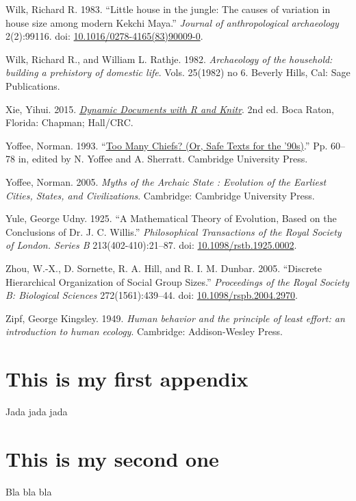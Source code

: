 \documentclass[
  12pt,
]{book}
\newlength{\cslhangindent}
\newlength{\cslentryspacingunit} %
\newenvironment{CSLReferences}[2] %
 {%
  \setlength{\parindent}{0pt}
  \ifodd #1
  \let\oldpar\par
  \def\par{\hangindent=\cslhangindent\oldpar}
  \fi
  \setlength{\parskip}{#2\cslentryspacingunit}
 }%
 {}
\begin{document}
\begin{CSLReferences}{1}{0}
\leavevmode{}%
Wilk, Richard R. 1983. {``Little house in the jungle: The causes of variation in house size among modern Kekchi Maya.''} \emph{Journal of anthropological archaeology} 2(2):99116. doi: \href{https://doi.org/10.1016/0278-4165(83)90009-0}{10.1016/0278-4165(83)90009-0}.

\leavevmode{}%
Wilk, Richard R., and William L. Rathje. 1982. \emph{Archaeology of the household: building a prehistory of domestic life}. Vols. 25(1982) no 6. Beverly Hills, Cal: Sage Publications.

\leavevmode{}%
Xie, Yihui. 2015. \emph{\href{http://yihui.name/knitr/}{Dynamic Documents with {R} and Knitr}}. 2nd ed. Boca Raton, Florida: Chapman; Hall/CRC.

\leavevmode{}%
Yoffee, Norman. 1993. {``\href{https://doi.org/10.1017/CBO9780511720277.007}{Too Many Chiefs? (Or, Safe Texts for the '90s)}.''} Pp. 60--78 in, edited by N. Yoffee and A. Sherratt. Cambridge University Press.

\leavevmode{}%
Yoffee, Norman. 2005. \emph{Myths of the Archaic State : Evolution of the Earliest Cities, States, and Civilizations}. Cambridge: Cambridge University Press.

\leavevmode{}%
Yule, George Udny. 1925. {``A Mathematical Theory of Evolution, Based on the Conclusions of Dr. J. C. Willis.''} \emph{Philosophical Transactions of the Royal Society of London. Series B} 213(402-410):21--87. doi: \href{https://doi.org/10.1098/rstb.1925.0002}{10.1098/rstb.1925.0002}.

\leavevmode{}%
Zhou, W.-X., D. Sornette, R. A. Hill, and R. I. M. Dunbar. 2005. {``Discrete Hierarchical Organization of Social Group Sizes.''} \emph{Proceedings of the Royal Society B: Biological Sciences} 272(1561):439--44. doi: \href{https://doi.org/10.1098/rspb.2004.2970}{10.1098/rspb.2004.2970}.

\leavevmode{}%
Zipf, George Kingsley. 1949. \emph{Human behavior and the principle of least effort: an introduction to human ecology}. Cambridge: Addison-Wesley Press.

\end{CSLReferences}

\hypertarget{appendix-appendix}{%
\appendix {}}


\hypertarget{this-is-my-first-appendix}{%
\chapter{This is my first appendix}\label{this-is-my-first-appendix}}

Jada jada jada

\hypertarget{this-is-my-second-one}{%
\chapter{This is my second one}\label{this-is-my-second-one}}

Bla bla bla
\end{document}
